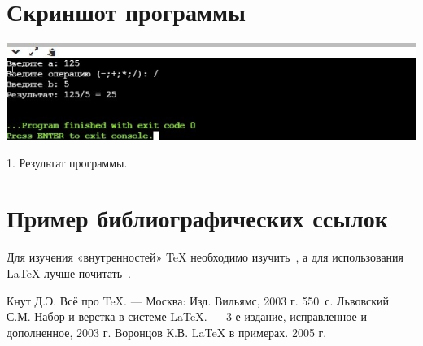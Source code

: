 \documentclass[12pt,a4paper]{scrartcl}
\begin{document}
\section{Скриншот программы}
\label{sec:intro}
\centering
\includegraphics[width=1.0\textwidth]{itog1.jpg}
\caption{1. Результат программы.}
\label{fig:par}
\section{Пример библиографических ссылок}

Для изучения «внутренностей» \TeX{} необходимо 
изучить~\cite{Knuth-2003}, а для использования \LaTeX{} лучше
почитать~\cite{Lvovsky-2003, Voroncov-2005}.

\begin{thebibliography}{9}
Кнут Д.Э. Всё про \TeX. \newblock --- Москва: Изд. Вильямс, 2003 г. 550~с.
Львовский С.М. Набор и верстка в системе \LaTeX{}. \newblock --- 3-е издание, исправленное и дополненное, 2003 г.
Воронцов К.В. \LaTeX{} в примерах. 2005 г.
\end{thebibliography}
\end{document}
